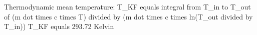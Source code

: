 Thermodynamic mean temperature:  
T_KF equals integral from T_in to T_out of (m dot times c times T) divided by (m dot times c times ln(T_out divided by T_in))  
T_KF equals 293.72 Kelvin